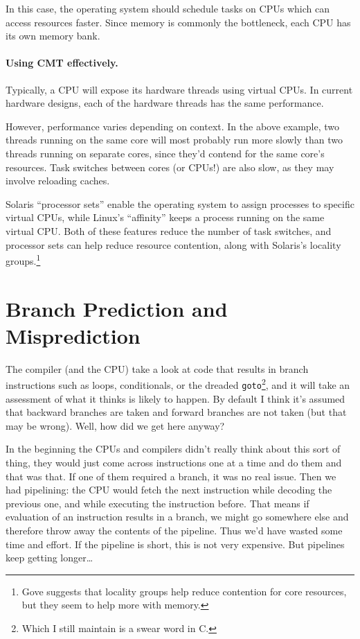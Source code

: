 \documentclass[a4paper]{report}
\begin{document}
In this case, the operating system should schedule tasks on CPUs which
can access resources faster.  Since memory is commonly the bottleneck,
each CPU has its own memory bank.

\paragraph{Using CMT effectively.} Typically, a CPU will expose its
hardware threads using virtual CPUs.
In current hardware designs, each of the hardware threads has the same
performance. 

However, performance varies depending on context. In the above
example, two threads running on the same core will most probably run
more slowly than two threads running on separate cores, since they'd
contend for the same core's resources. Task switches between cores (or
CPUs!) are also slow, as they may involve reloading caches.

Solaris ``processor sets''
enable the operating system to assign processes to specific virtual CPUs,
while Linux's ``affinity'' keeps a process running on the same virtual CPU.
Both of these features reduce the number of task switches, and processor
sets can help reduce resource contention, along with Solaris's locality
groups.\footnote{Gove suggests that locality groups help reduce contention
for core resources, but they seem to help more with memory.}



\section*{Branch Prediction and Misprediction}

The compiler (and the CPU) take a look at code that results in branch instructions  such as loops, conditionals, or the dreaded \texttt{goto}\footnote{Which I still maintain is a swear word in C.}, and it will take an assessment of what it thinks is likely to happen. By default I think it's assumed that backward branches are taken and forward branches are not taken (but that may be wrong).  Well, how did we get here anyway?

In the beginning the CPUs and compilers didn't really think about this sort of thing, they would just come across instructions one at a time and do them and that was that. If one of them required a branch, it was no real issue. Then we had pipelining: the CPU would fetch the next instruction while decoding the previous one, and while executing the instruction before. That means if evaluation of an instruction results in a branch, we might go somewhere else and therefore throw away the contents of the pipeline. Thus we'd have wasted some time and effort. If the pipeline is short, this is not very expensive. But pipelines keep getting longer\ldots
\end{document}
